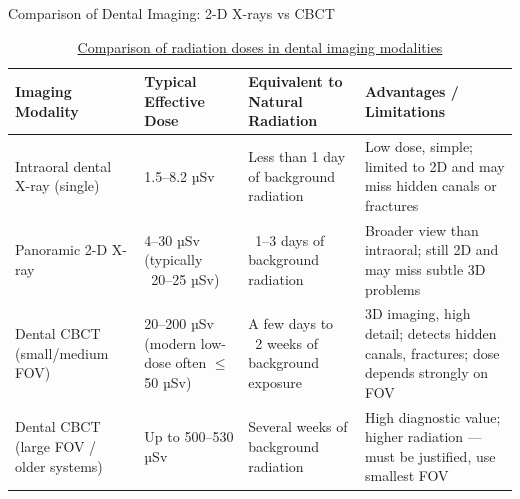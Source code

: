\documentclass[aspectratio=169]{beamer}
\begin{document}
\begin{frame}{Comparison of Dental Imaging: 2-D X-rays vs CBCT}

\small
\begin{table}[ht]
\centering
\begin{tabular}{|p{3cm}|p{2.7cm}|p{3.2cm}|p{4.2cm}|}
\hline
\textbf{Imaging Modality} & 
\textbf{Typical Effective Dose} & 
\textbf{Equivalent to Natural Radiation} &
\textbf{Advantages / Limitations} \\
\hline

Intraoral dental X-ray (single) &
1.5–8.2 µSv &
Less than 1 day of background radiation &
Low dose, simple; limited to 2D and may miss hidden canals or fractures \\ 
\hline

Panoramic 2-D X-ray &
4–30 µSv (typically ~20–25 µSv) &
~1–3 days of background radiation &
Broader view than intraoral; still 2D and may miss subtle 3D problems \\ 
\hline

Dental CBCT (small/medium FOV) &
20–200 µSv (modern low-dose often $\leq$50 µSv) &
A few days to ~2 weeks of background exposure &
3D imaging, high detail; detects hidden canals, fractures; dose depends strongly on FOV \\ 
\hline

Dental CBCT (large FOV / older systems) &
Up to 500–530 µSv &
Several weeks of background radiation &
High diagnostic value; higher radiation — must be justified, use smallest FOV \\ 
\hline

\end{tabular}
\caption{\href{https://www.endodonticexcellence.com/blog/why-modern-dental-x-rays-cbct-scans-are-safe/}{Comparison of radiation doses in dental imaging modalities}}
\label{tab:radiation-comparison}
\end{table}

\end{frame}
\end{document}
